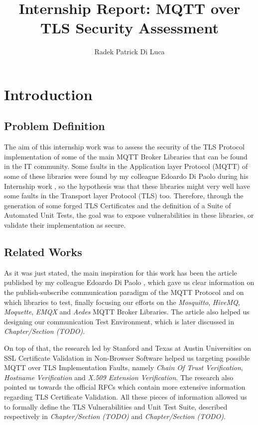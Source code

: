 \documentclass[binding=0.6cm,noexaminfo]{sapthesis}
\title{Internship Report: MQTT over TLS Security Assessment} \author{Radek Patrick Di Luca}
\begin{document}
\frontmatter
\maketitle
\tableofcontents
\mainmatter
\chapter{Introduction}
\section{Problem Definition}
The aim of this internship work was to assess the security of the TLS Protocol implementation of some of the main MQTT Broker Libraries that can be found in the IT community. Some faults in the Application layer Protocol (MQTT) of some of these libraries were found by my colleague Edoardo Di Paolo during his Internship work \cite{mqttpaper}, so the hypothesis was that these libraries might very well have some faults in the Transport layer Protocol (TLS) too.
Therefore, through the generation of some forged TLS Certificates and the definition of a Suite of Automated Unit Tests, the goal was to expose vulnerabilities in these libraries, or validate their implementation as secure.

\section{Related Works}
As it was just stated, the main inspiration for this work has been the article published by my colleague Edoardo Di Paolo \cite{mqttpaper}, which gave us clear information on the publish-subscribe communication paradigm of the MQTT Protocol and on which libraries to test, finally focusing our efforts on the \textit{Mosquitto}, \textit{HiveMQ}, \textit{Moquette}, \textit{EMQX} and \textit{Aedes} MQTT Broker Libraries. The article \cite{mqttpaper} also helped us designing our communication Test Environment, which is later discussed in \textit{Chapter/Section (TODO)}.

On top of that, the research led by Stanford and Texas at Austin Universities on SSL Certificate Validation in Non-Browser Software \cite{sslvalidation} helped us targeting possible MQTT over TLS Implementation Faults, namely \textit{Chain Of Trust Verification}, \textit{Hostname Verification} and \textit{X.509 Extension Verification}. The research \cite{sslvalidation} also pointed us towards the official RFCs \cites{rfc2818}{rfc5280}{rfc8446} which contain more extensive information regarding TLS Certificate Validation. All these pieces of information allowed us to formally define the TLS Vulnerabilities and Unit Test Suite, described respectively in \textit{Chapter/Section (TODO)} and \textit{Chapter/Section (TODO)}.
\end{document}
